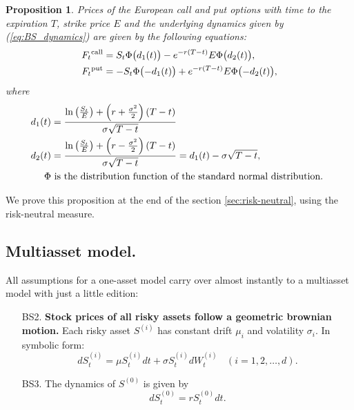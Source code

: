 \documentclass[a4paper,11pt, twoside]{book}
\newtheorem{prop}[thm]{Proposition}
\theoremstyle{definition}
\theoremstyle{remark}
\begin{document}
\begin{prop}
\label{prop:BSFormula}
Prices of the European call and put options with time to the expiration $T$, strike price $E$ and the underlying dynamics given by (\ref{eq:BS_dynamics}) are given by the following equations:
\begin{equation*}
  \begin{split}
    F_t\textsuperscript{call} &= S_t \Phi\bigl( d_1(t) \bigr) - e^{-r(T-t)} E \Phi\bigl(d_2(t) \bigr),\\
    F_t\textsuperscript{put} &= -S_t \Phi\bigl(-d_1(t) \bigr) + e^{-r(T-t)} E \Phi\bigl(-d_2(t) \bigr), 
  \end{split}
\end{equation*}
where
\begin{align*}
d_1(t) &= \frac{\ln\left(\frac{S_t}{E}\right)+\left(r+\frac{\sigma^{2}}{2}\right)(T-t)}{\sigma\sqrt{T-t}}\\
d_2(t) &= \frac{\ln\left(\frac{S_t}{E}\right)+\left(r-\frac{\sigma^{2}}{2}\right)(T-t)}{\sigma\sqrt{T-t}} = d_{1}(t)-\sigma\sqrt{T-t},\\
\Phi & \hbox{ is the distribution function of the standard normal distribution. } 
\end{align*}
\end{prop}
We prove this proposition at the end of the section \ref{sec:risk-neutral}, using the risk-neutral measure.

\subsection{Multiasset model.}
All assumptions for a one-asset model carry over almost instantly to a multiasset model with just a little edition:
\begin{enumerate}
 \item[BS2.] \textbf{Stock prices of all risky assets follow a geometric brownian motion.} Each risky asset $S^{(i)}$ has constant drift $\mu_i$ and volatility $\sigma_i$. In symbolic form:
\begin{equation}
 \label{eq:BS_multi_dynamics}
 dS^{(i)}_t = \mu S^{(i)}_t dt + \sigma S^{(i)}_t dW^{(i)}_t\ \ \ \ (i=1,2,\ldots,d). 
\end{equation}
  \item[BS3.]  The dynamics of $S^{(0)}$ is given by 
\[ dS^{(0)}_t = rS^{(0)}_t dt. \]
\end{enumerate}
  
\end{document}
